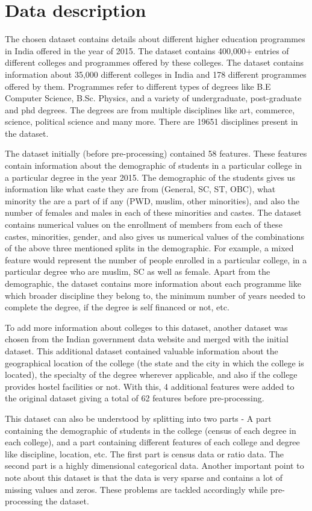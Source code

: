 \section{Data description}
The chosen dataset contains details about different higher education programmes in India offered in the year of 2015. The dataset contains 400,000+ entries  of different colleges and programmes offered by these colleges. The dataset contains information about 35,000 different colleges in India and 178 different programmes offered by them. Programmes refer to different types of degrees like B.E Computer Science, B.Sc. Physics, and a variety of undergraduate, post-graduate and phd degrees. The degrees are from multiple disciplines like art, commerce, science, political science and many more. There are 19651 disciplines present in the dataset. 

The dataset initially (before pre-processing) contained 58 features. These features contain information about the demographic of students in a particular college in a particular degree in the year 2015. The demographic of the students gives us information like what caste they are from (General, SC, ST, OBC), what minority the are a part of if any (PWD, muslim, other minorities), and also the number of females and males in each of these minorities and castes. The dataset contains numerical values on the enrollment of members from each of these castes, minorities, gender, and also gives us numerical values of the combinations of the above three mentioned splits in the demographic. For example, a mixed feature would represent the number of people enrolled in a particular college, in a particular degree who are muslim, SC as well as female. 
Apart from the demographic, the dataset contains more information about each programme like which broader discipline they belong to, the minimum number of years needed to complete the degree, if the degree is self financed or not, etc. 

To add more information about colleges to this dataset, another dataset \cite{b5} was chosen from the Indian government data website and merged with the initial dataset. This additional dataset contained valuable information about the geographical location of the college (the state and the city in which the college is located), the specialty of the degree wherever applicable, and also if the college provides hostel facilities or not. With this, 4 additional features were added to the original dataset giving a total of 62 features before pre-processing.  

This dataset can also be understood by splitting into two parts - A part containing the demographic of students in the college (census of each degree in each college), and a part containing different features of each college and degree like discipline, location, etc. The first part is census data or ratio data. The second part is a highly dimensional categorical data. Another important point to note about this dataset is that the data is very sparse and contains a lot of missing values and zeros. These problems are tackled accordingly while pre-processing the dataset. 
